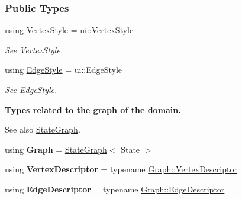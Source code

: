 \subsubsection*{Public Types}
\begin{DoxyCompactItemize}
\item 
using \hyperlink{structVisualEvent_aa9a4b26fbfd3265493496f18a5495022}{Vertex\+Style} = ui\+::\+Vertex\+Style\hypertarget{structVisualEvent_aa9a4b26fbfd3265493496f18a5495022}{}\label{structVisualEvent_aa9a4b26fbfd3265493496f18a5495022}

\begin{DoxyCompactList}\small\item\em See \hyperlink{structVertexStyle}{Vertex\+Style}. \end{DoxyCompactList}\item 
using \hyperlink{structVisualEvent_ab4aa8ae73e19b337c7f23b39ff9acabf}{Edge\+Style} = ui\+::\+Edge\+Style\hypertarget{structVisualEvent_ab4aa8ae73e19b337c7f23b39ff9acabf}{}\label{structVisualEvent_ab4aa8ae73e19b337c7f23b39ff9acabf}

\begin{DoxyCompactList}\small\item\em See \hyperlink{structEdgeStyle}{Edge\+Style}. \end{DoxyCompactList}\end{DoxyCompactItemize}
\begin{Indent}{\bf Types related to the graph of the domain.}\par
{\em \begin{DoxySeeAlso}{See also}
\hyperlink{structStateGraph}{State\+Graph}. 
\end{DoxySeeAlso}
}\begin{DoxyCompactItemize}
\item 
using {\bfseries Graph} = \hyperlink{structStateGraph}{State\+Graph}$<$ State $>$\hypertarget{structVisualEvent_a5c9166925bc970079bdcaa85c1e3c7f3}{}\label{structVisualEvent_a5c9166925bc970079bdcaa85c1e3c7f3}

\item 
using {\bfseries Vertex\+Descriptor} = typename \hyperlink{structStateGraph_a95d7ea26b0d0d07d3488068a8e9be53c}{Graph\+::\+Vertex\+Descriptor}\hypertarget{structVisualEvent_a8a3fb82c49fda109e9b0f935fb1f862b}{}\label{structVisualEvent_a8a3fb82c49fda109e9b0f935fb1f862b}

\item 
using {\bfseries Edge\+Descriptor} = typename \hyperlink{structStateGraph_a419a555605bf486301b84dd6055d81f2}{Graph\+::\+Edge\+Descriptor}\hypertarget{structVisualEvent_a19ea91461360705f2876ce1fb6dbeb18}{}\label{structVisualEvent_a19ea91461360705f2876ce1fb6dbeb18}

\end{DoxyCompactItemize}
\end{Indent}
